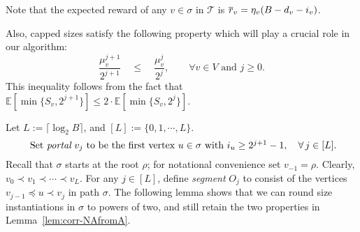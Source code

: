 \documentclass[11pt,letterpaper]{article}
\numberwithin{algorithm}{section}
\newcommand{\T}{\ensuremath{\mathcal{T}}\xspace}
\newcommand{\E}{\mathbb{E}}
\begin{document}
Note that the expected reward of any $v\in\sigma$ in \T is $\overline{r}_v=\eta_v(B-d_v-i_v)$.

Also, capped sizes satisfy the following property which will play a crucial role  in our algorithm:
\begin{equation}\label{eq:capped-mu}
\frac{\mu^{j+1}_v}{2^{j+1}} \quad \le \quad \frac{\mu^{j}_v}{2^{j}},\qquad \forall v\in V \mbox{ and } j\ge 0.
\end{equation}
This inequality follows from the fact that $\E\left[\min\{S_v,2^{j+1}\}\right]\le 2\cdot \E\left[\min\{S_v,2^j\}\right]$.



Let $L:=\lceil \log_2B\rceil$, and $[L]:=\{0,1,\cdots,L\}$.  \begin{equation}\label{eq:NA-portals}
\mbox{ Set {\em portal} $v_j$ to be the first vertex $u\in \sigma$ with $i_u\ge 2^{j+1}-1$}, \quad \forall \, j\in [L].
\end{equation}
Recall that $\sigma$ starts at the root $\rho$; for notational convenience set $v_{-1}=\rho$. Clearly, $v_0\prec v_1\prec\cdots \prec v_{L}$.
For any $j\in [L]$, define {\em segment} $O_j$ to consist of the vertices $v_{j-1}\preceq u\prec v_j$ in path $\sigma$. The following lemma shows that
we can round size instantiations in $\sigma$ to powers of two, and still retain the two properties in Lemma~\ref{lem:corr-NAfromA}.
\end{document}
